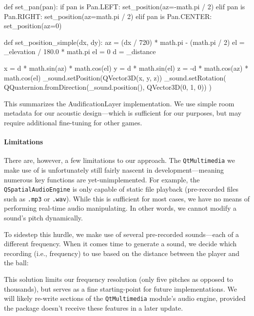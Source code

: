 \documentclass{report}
\begin{document}
\begin{codeblock}
def set_pan(pan):
    if pan is Pan.LEFT:
        set_position(az=-math.pi / 2)
    elif pan is Pan.RIGHT:
        set_position(az=math.pi / 2)
    elif pan is Pan.CENTER:
        set_position(az=0)
\end{codeblock}

\begin{codeblock}
def set_position_simple(dx, dy):
    az = (dx / 720) * math.pi - (math.pi / 2)
    el = _elevation / 180.0 * math.pi
    el = 0
    d = _distance

    x = d * math.sin(az) * math.cos(el)
    y = d * math.sin(el)
    z = -d * math.cos(az) * math.cos(el)
    _sound.setPosition(QVector3D(x, y, z))
    _sound.setRotation(
        QQuaternion.fromDirection(_sound.position(), QVector3D(0, 1, 0))
    )
\end{codeblock}

This summarizes the AudificationLayer implementation. We use simple room metadata for our acoustic design---which is sufficient for our purposes, but may require additional fine-tuning for other games. 

\paragraph{Limitations}
There are, however, a few limitations to our approach. The \texttt{QtMultimedia} we make use of is unfortunately still fairly nascent in development---meaning numerous key functions are yet-unimplemented. For example, the \texttt{QSpatialAudioEngine} is only capable of static file playback (pre-recorded files such as \texttt{.mp3} or \texttt{.wav}). While this is sufficient for most cases, we have no means of performing real-time audio manipulating. In other words, we cannot modify a sound's pitch dynamically. 

To sidestep this hurdle, we make use of several pre-recorded sounds---each of a different frequency. When it comes time to generate a sound, we decide which recording (i.e., frequency) to use based on the distance between the player and the ball:


This solution limits our frequency resolution (only five pitches as opposed to thousands), but serves as a fine starting-point for future implementations. We will likely re-write sections of the \texttt{QtMultimedia} module's audio engine, provided the package doesn't receive these features in a later update.
\end{document}
